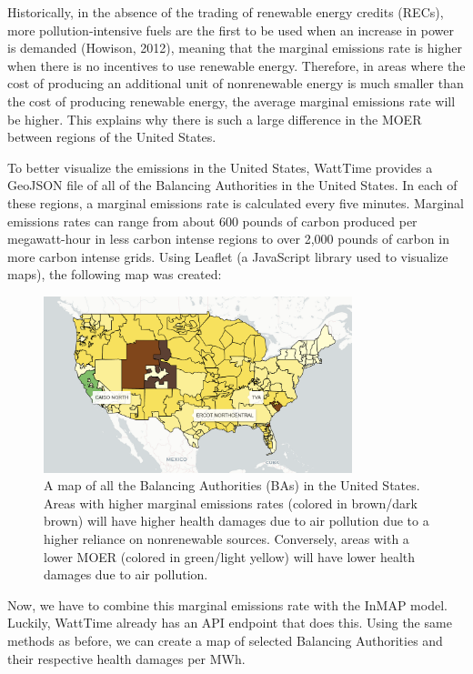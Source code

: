 \documentclass{article}
\begin{document}
Historically, in the absence of the trading of renewable energy credits (RECs), more pollution-intensive fuels are the first to be
used when an increase in power is demanded (Howison, 2012), meaning that the marginal emissions rate is higher when there is no incentives to use
renewable energy. Therefore, in areas where the cost of producing an additional unit of nonrenewable energy is much smaller than the 
cost of producing renewable energy, the average marginal emissions rate will be higher. This explains why there is such a large difference
in the MOER between regions of the United States. 


To better visualize the emissions in the United States, WattTime provides a GeoJSON file of all of the Balancing Authorities
in the United States. In each of these regions, a marginal emissions rate is calculated every five minutes. Marginal emissions rates
can range from about 600 pounds of carbon produced per megawatt-hour in less carbon intense regions to over 2,000 pounds of carbon 
in more carbon intense grids. Using Leaflet (a JavaScript library used to visualize maps), the following map was created:

\begin{figure}[h]
    \centering
    \includegraphics[width=0.8\textwidth]{moer-map.png}
    \caption{A map of all the Balancing Authorities (BAs) in the United States. Areas with higher marginal emissions rates (colored in brown/dark brown)
    will have higher health damages due to air pollution due to a higher reliance on nonrenewable sources. Conversely, areas with a lower MOER (colored in green/light yellow)
    will have lower health damages due to air pollution.}
    \label{fig:grid5}
\end{figure}

Now, we have to combine this marginal emissions rate with the InMAP model. Luckily, WattTime already has an API endpoint
that does this. Using the same methods as before, we can create a map of selected Balancing Authorities and their respective health
damages per MWh.
\end{document}

